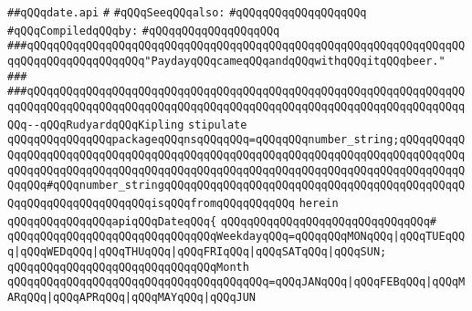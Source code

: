 \label{src/lib/std/src/date.api}
\verb|##qQQqdate.api|\newline
\verb|#|\newline
\verb|#qQQqSeeqQQqalso:|\newline
\verb|#qQQqqQQqqQQqqQQqqQQq|\newline
\newline
\verb|#qQQqCompiledqQQqby:|\newline
\verb|#qQQqqQQqqQQqqQQqqQQq|\newline
\newline
\newline
\newline
\verb|###qQQqqQQqqQQqqQQqqQQqqQQqqQQqqQQqqQQqqQQqqQQqqQQqqQQqqQQqqQQqqQQqqQQqqQQqqQQqqQQqqQQqqQQq"PaydayqQQqcameqQQqandqQQqwithqQQqitqQQqbeer."|\newline
\verb|###|\newline
\verb|###qQQqqQQqqQQqqQQqqQQqqQQqqQQqqQQqqQQqqQQqqQQqqQQqqQQqqQQqqQQqqQQqqQQqqQQqqQQqqQQqqQQqqQQqqQQqqQQqqQQqqQQqqQQqqQQqqQQqqQQqqQQqqQQqqQQqqQQqqQQq--qQQqRudyardqQQqKipling|\newline
\newline
\newline
\newline
\verb|stipulate|\newline
\verb|qQQqqQQqqQQqqQQqpackageqQQqnsqQQqqQQq=qQQqqQQqnumber_string;qQQqqQQqqQQqqQQqqQQqqQQqqQQqqQQqqQQqqQQqqQQqqQQqqQQqqQQqqQQqqQQqqQQqqQQqqQQqqQQqqQQqqQQqqQQqqQQqqQQqqQQqqQQqqQQqqQQqqQQqqQQqqQQqqQQqqQQqqQQqqQQqqQQqqQQqqQQq#qQQqnumber_stringqQQqqQQqqQQqqQQqqQQqqQQqqQQqqQQqqQQqqQQqqQQqqQQqqQQqqQQqqQQqqQQqqQQqisqQQqfromqQQqqQQqqQQq|\newline
\verb|herein|\newline
\newline
\verb|qQQqqQQqqQQqqQQqapiqQQqDateqQQq{|\newline
\verb|qQQqqQQqqQQqqQQqqQQqqQQqqQQqqQQq#|\newline
\verb|qQQqqQQqqQQqqQQqqQQqqQQqqQQqqQQqWeekdayqQQq=qQQqqQQqMONqQQq|\verb#|qQQqTUEqQQq|qQQqWEDqQQq|qQQqTHUqQQq|qQQqFRIqQQq|qQQqSATqQQq|qQQqSUN;#\newline
\newline
\verb|qQQqqQQqqQQqqQQqqQQqqQQqqQQqqQQqMonth|\newline
\verb|qQQqqQQqqQQqqQQqqQQqqQQqqQQqqQQqqQQqqQQq=qQQqJANqQQq|\verb#|qQQqFEBqQQq|qQQqMARqQQq|qQQqAPRqQQq|qQQqMAYqQQq|qQQqJUN#\newline
